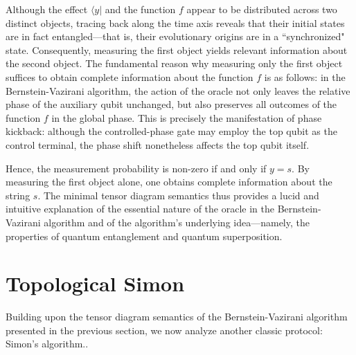 \documentclass[a4paper,twocolumn,11pt,unpublished]{quantumarticle}
\numberwithin{equation}{section}
\begin{document}
Although the effect $\langle y \vert$ and the function $f$ appear to be distributed across two distinct objects, tracing back along the time axis reveals that their initial states are in fact entangled—that is, their evolutionary origins are in a ``synchronized" state. Consequently, measuring the first object yields relevant information about the second object. The fundamental reason why measuring only the first object suffices to obtain complete information about the function $f$ is as follows: in the Bernstein-Vazirani algorithm, the action of the oracle not only leaves the relative phase of the auxiliary qubit unchanged, but also preserves all outcomes of the function $f$ in the global phase. This is precisely the manifestation of phase kickback: although the controlled-phase gate may employ the top qubit as the control terminal, the phase shift nonetheless affects the top qubit itself.
\begin{center}
\end{center}

Hence, the measurement probability is non-zero if and only if $y=s$. By measuring the first object alone, one obtains complete information about the string $s$. The minimal tensor diagram semantics thus provides a lucid and intuitive explanation of the essential nature of the oracle in the Bernstein-Vazirani algorithm and of the algorithm's underlying idea—namely, the properties of quantum entanglement and quantum superposition.

\section{Topological Simon}
Building upon the tensor diagram semantics of the Bernstein-Vazirani algorithm presented in the previous section, we now analyze another classic protocol: Simon's algorithm..
\end{document}
